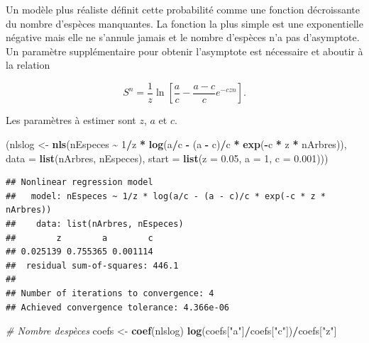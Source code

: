 \documentclass[
  11pt,
  french,
  a4paper,
  extrafontsizes,onecolumn,openright
  ]{memoir}
\newenvironment{Shaded}{\begin{snugshade}}{\end{snugshade}}
\newcommand{\AttributeTok}[1]{\textcolor[rgb]{0.13,0.29,0.53}{#1}}
\newcommand{\CommentTok}[1]{\textcolor[rgb]{0.56,0.35,0.01}{\textit{#1}}}
\newcommand{\DecValTok}[1]{\textcolor[rgb]{0.00,0.00,0.81}{#1}}
\newcommand{\FloatTok}[1]{\textcolor[rgb]{0.00,0.00,0.81}{#1}}
\newcommand{\FunctionTok}[1]{\textcolor[rgb]{0.13,0.29,0.53}{\textbf{#1}}}
\newcommand{\NormalTok}[1]{#1}
\newcommand{\OtherTok}[1]{\textcolor[rgb]{0.56,0.35,0.01}{#1}}
\newcommand{\SpecialCharTok}[1]{\textcolor[rgb]{0.81,0.36,0.00}{\textbf{#1}}}
\newcommand{\StringTok}[1]{\textcolor[rgb]{0.31,0.60,0.02}{#1}}
\begin{document}
Un modèle plus réaliste définit cette probabilité comme une fonction décroissante du nombre d'espèces manquantes.
La fonction la plus simple est une exponentielle négative mais elle ne s'annule jamais et le nombre d'espèces n'a pas d'asymptote.
Un paramètre supplémentaire pour obtenir l'asymptote est nécessaire et aboutir à la relation

\begin{equation} 
  \label{eq:Soberon1993b}
  S^{n} = \frac{1}{z} \ln \left[ \frac{a}{c} - \frac{a-c}{c} e^{-czn} \right].
\end{equation}

Les paramètres à estimer sont \(z\), \(a\) et \(c\).

\scriptsize

\begin{Shaded}
\begin{Highlighting}[]
\NormalTok{(nlslog }\OtherTok{\textless{}{-}} \FunctionTok{nls}\NormalTok{(nEspeces }\SpecialCharTok{\textasciitilde{}} \DecValTok{1}\SpecialCharTok{/}\NormalTok{z }\SpecialCharTok{*} \FunctionTok{log}\NormalTok{(a}\SpecialCharTok{/}\NormalTok{c }\SpecialCharTok{{-}}\NormalTok{ (a }\SpecialCharTok{{-}}\NormalTok{ c)}\SpecialCharTok{/}\NormalTok{c }\SpecialCharTok{*} \FunctionTok{exp}\NormalTok{(}\SpecialCharTok{{-}}\NormalTok{c }\SpecialCharTok{*}
\NormalTok{    z }\SpecialCharTok{*}\NormalTok{ nArbres)), }\AttributeTok{data =} \FunctionTok{list}\NormalTok{(nArbres, nEspeces), }\AttributeTok{start =} \FunctionTok{list}\NormalTok{(}\AttributeTok{z =} \FloatTok{0.05}\NormalTok{,}
    \AttributeTok{a =} \DecValTok{1}\NormalTok{, }\AttributeTok{c =} \FloatTok{0.001}\NormalTok{)))}
\end{Highlighting}
\end{Shaded}

\begin{verbatim}
## Nonlinear regression model
##   model: nEspeces ~ 1/z * log(a/c - (a - c)/c * exp(-c * z * nArbres))
##    data: list(nArbres, nEspeces)
##        z        a        c 
## 0.025139 0.755365 0.001114 
##  residual sum-of-squares: 446.1
## 
## Number of iterations to convergence: 4 
## Achieved convergence tolerance: 4.366e-06
\end{verbatim}

\begin{Shaded}
\begin{Highlighting}[]
\CommentTok{\# Nombre d\textquotesingle{}espèces}
\NormalTok{coefs }\OtherTok{\textless{}{-}} \FunctionTok{coef}\NormalTok{(nlslog)}
\FunctionTok{log}\NormalTok{(coefs[}\StringTok{"a"}\NormalTok{]}\SpecialCharTok{/}\NormalTok{coefs[}\StringTok{"c"}\NormalTok{])}\SpecialCharTok{/}\NormalTok{coefs[}\StringTok{"z"}\NormalTok{]}
\end{Highlighting}
\end{Shaded}
\end{document}

